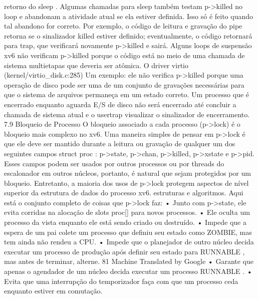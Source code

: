 retorno  do  sleep .  Algumas  chamadas  para  sleep  também  testam  p->killed  no  loop  e  abandonam  a  atividade  atual  se  ela  
estiver  definida.  Isso  só  é  feito  quando  tal  abandono  for  correto.  Por  exemplo,  o  código  de  leitura  e  gravação  do  pipe  retorna  
se  o  sinalizador  killed  estiver  definido;  eventualmente,  o  código  retornará  para  trap,  que  verificará  novamente  p->killed  e  sairá.
 Alguns  loops  de  suspensão  xv6  não  verificam  p->killed  porque  o  código  está  no  meio  de  uma  chamada  de  
sistema  multietapas  que  deveria  ser  atômica.  O  driver  virtio  (kernel/virtio_disk.c:285)  Um  exemplo:  ele  não  verifica  
p->killed  porque  uma  operação  de  disco  pode  ser  uma  de  um  conjunto  de  gravações  necessárias  para  que  o  
sistema  de  arquivos  permaneça  em  um  estado  correto.  Um  processo  que  é  encerrado  enquanto  aguarda  E/S  de  
disco  não  será  encerrado  até  concluir  a  chamada  de  sistema  atual  e  o  usertrap  visualizar  o  sinalizador  de  encerramento.
 7.9  Bloqueio  de  Processo
 O  bloqueio  associado  a  cada  processo  (p->lock)  é  o  bloqueio  mais  complexo  no  xv6.  Uma  maneira  simples  de  
pensar  em  p->lock  é  que  ele  deve  ser  mantido  durante  a  leitura  ou  gravação  de  qualquer  um  dos  seguintes  
campos  struct  proc :  p->state,  p->chan,  p->killed,  p->xstate  e  p->pid.  Esses  campos  podem  ser  usados  por  outros  
processos  ou  por  threads  do  escalonador  em  outros  núcleos,  portanto,  é  natural  que  sejam  protegidos  por  um  
bloqueio.
 Entretanto,  a  maioria  dos  usos  de  p->lock  protegem  aspectos  de  nível  superior  da  estrutura  de  dados  do  processo  xv6.
 estruturas  e  algoritmos.  Aqui  está  o  conjunto  completo  de  coisas  que  p->lock  faz:
 •  Junto  com  p->state,  ele  evita  corridas  na  alocação  de  slots  proc[]  para  novos  processos.
 •  Ele  oculta  um  processo  da  vista  enquanto  ele  está  sendo  criado  ou  destruído.
 •  Impede  que  a  espera  de  um  pai  colete  um  processo  que  definiu  seu  estado  como  ZOMBIE,  mas  tem
 ainda  não  rendeu  a  CPU.
 •  Impede  que  o  planejador  de  outro  núcleo  decida  executar  um  processo  de  produção  após  definir  seu
 estado  para  RUNNABLE ,  mas  antes  de  terminar,  alterne.
 81
Machine Translated by Google
 •  Garante  que  apenas  o  agendador  de  um  núcleo  decida  executar  um  processo  RUNNABLE .
 •  Evita  que  uma  interrupção  do  temporizador  faça  com  que  um  processo  ceda  enquanto  estiver  em  comutação.
